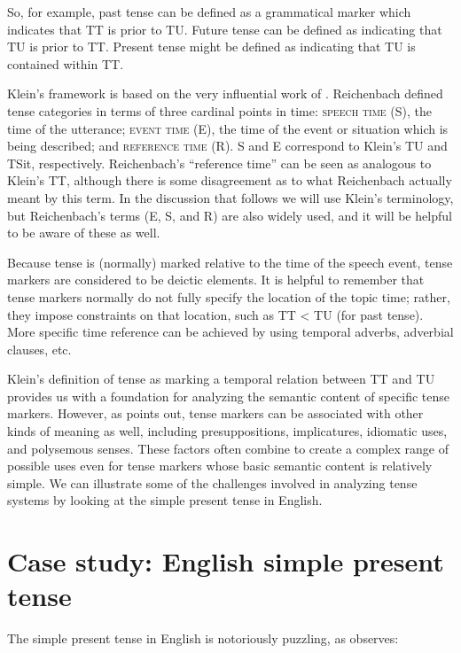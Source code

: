 So, for example, past tense can be defined as a grammatical marker which indicates that TT is prior to TU. Future tense can be defined as indicating that TU is prior to TT. Present tense might be defined as indicating that TU is contained within TT.


\largerpage
Klein’s framework is based on the very influential work of \citet{Reichenbach1947}. Reichenbach defined tense categories in terms of three cardinal points in time: \textsc{speech time} (S), the time of the utterance; \textsc{event time} (E), the time of the event or situation which is being described; and \textsc{reference time} (R). S and E correspond to Klein’s TU and TSit, respectively. Reichenbach’s “reference time” can be seen as analogous to Klein’s TT, although there is some disagreement as to what Reichenbach actually meant by this term. In the discussion that follows we will use Klein’s terminology, but Reichenbach’s terms (E, S, and R) are also widely used, and it will be helpful to be aware of these as well.



Because tense is (normally) marked relative to the time of the speech event, tense markers are considered to be deictic elements. It is helpful to remember that tense markers normally do not fully specify the location of the topic time; rather, they impose constraints on that location, such as TT < TU (for past tense). More specific time reference can be achieved by using temporal adverbs, adverbial clauses, etc.



Klein’s definition of tense as marking a temporal relation between TT and TU provides us with a foundation for analyzing the semantic content of specific tense markers. However, as \citet[26--29, 54--55]{Comrie1985} points out, tense markers can be associated with other kinds of meaning as well, including presuppositions, implicatures, idiomatic uses, and polysemous senses. These factors often combine to create a complex range of possible uses even for tense markers whose basic semantic content is relatively simple. We can illustrate some of the challenges involved in analyzing tense systems by looking at the simple present tense in English.


\section{Case study: English simple present tense}\label{sec:21.3}

The simple present tense in English is notoriously puzzling, as \citet{Langacker2001} observes:


